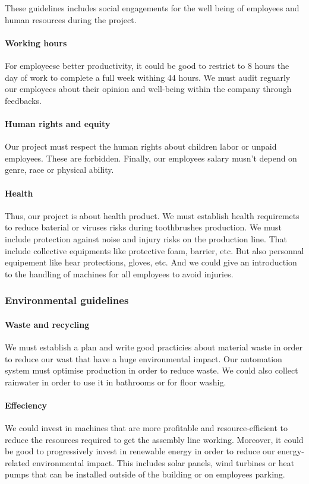 These guidelines includes social engagements for the well being of employees and human resources during the project.

\paragraph{Working hours} For employeese better productivity, it could be good to restrict to 8 hours the day of work to complete a full week withing 44 hours.
We must audit reguarly our employees about their opinion and well-being within the company through feedbacks.

\paragraph{Human rights and equity} Our project must respect the human rights about children labor or unpaid employees.
These are forbidden.
Finally, our employees salary musn't depend on genre, race or physical ability. 

\paragraph{Health} Thus, our project is about health product.
We must establish health requiremets to reduce baterial or viruses risks during toothbrushes production.
We must include protection against noise and injury risks on the production line.
That include collective equipments like protective foam, barrier, etc.
But also personnal equipement like hear protections, gloves, etc.
And we could give an introduction to the handling of machines for all employees to avoid injuries.

\subsubsection{Environmental guidelines}

\paragraph{Waste and recycling} We must establish a plan and write good practicies about material waste in order to reduce our wast that have a huge environmental impact.
Our automation system must optimise production in order to reduce waste.
We could also collect rainwater in order to use it in bathrooms or for floor washig.

\paragraph{Effeciency} We could invest in machines that are more profitable and resource-efficient to reduce the resources required to get the assembly line working.
Moreover, it could be good to progressively invest in renewable energy in order to reduce our energy-related environmental impact.
This includes solar panels, wind turbines or heat pumps that can be installed outside of the building or on employees parking.

